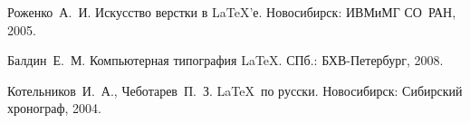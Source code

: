 \documentclass[14pt,a4paper,report]{ncc}
\begin{document}
\renewcommand{\chaptername}{Лабораторная работа}
\def\contentsname{Содержание}
\def\student{Смирнов М.Г.}
\def\group{P3164}
\def\teacher{ФИО преподавателя}
\def\worknumber{1}
\def\studyfield{Название предмета}
\def\theme{Название темы}

\maketitle

\tableofcontents
\newpage

%

\begin{thebibliography}{9}

Роженко~А.~И. Искусство верстки в \LaTeX'е.  Новосибирск: ИВМиМГ СО~РАН, 2005.

Балдин~Е.~М. Компьютерная типография \LaTeX.  СПб.: БХВ-Петербург, 2008.

Котельников~И.~А., Чеботарев~П.~З. \LaTeX\ по русски.
Новосибирск: Сибирский хронограф, 2004. 

\end{thebibliography}
\end{document}
